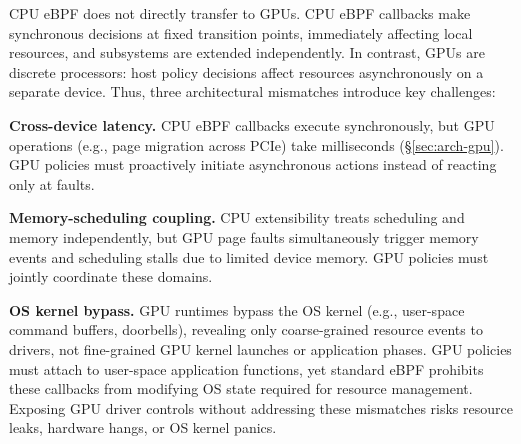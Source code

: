 CPU eBPF does not directly transfer to GPUs.
CPU eBPF callbacks make synchronous decisions at fixed transition points, immediately affecting local resources, and subsystems are extended independently.
In contrast, GPUs are discrete processors: host policy decisions affect resources asynchronously on a separate device.
Thus, three architectural mismatches introduce key challenges:

\textbf{Cross-device latency.}
CPU eBPF callbacks execute synchronously, but GPU operations (e.g., page migration across PCIe) take milliseconds (\S\ref{sec:arch-gpu}).
GPU policies must proactively initiate asynchronous actions instead of reacting only at faults.

\textbf{Memory-scheduling coupling.}
CPU extensibility treats scheduling and memory independently, but GPU page faults simultaneously trigger memory events and scheduling stalls due to limited device memory.
GPU policies must jointly coordinate these domains.

\textbf{OS kernel bypass.}
GPU runtimes bypass the OS kernel (e.g., user-space command buffers, doorbells), revealing only coarse-grained resource events to drivers, not fine-grained GPU kernel launches or application phases.
GPU policies must attach to user-space application functions, yet standard eBPF prohibits these callbacks from modifying OS state required for resource management.
Exposing GPU driver controls without addressing these mismatches risks resource leaks, hardware hangs, or OS kernel panics.

